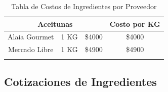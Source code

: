\documentclass[12pt]{article}
\begin{document}
\begin{longtable}{|| c | c | c | c||}
        \multicolumn{3}{||c|}{\textbf{Aceitunas}} & \textbf{Costo por KG} \\ [0.5ex] \hline \hline %
        Alaia Gourmet & 1 KG & \$4000 & \$4000 \\ \hline
        Mercado Libre & 1 KG & \$4900 & \$4900 \\ [1ex] \hline \hline

    \caption{Tabla de Costos de Ingredientes por Proveedor}
    \label{tab:costos_ingredientes_proveedor}
    \end{longtable} %


\subsection{Cotizaciones de Ingredientes}
\end{document}
